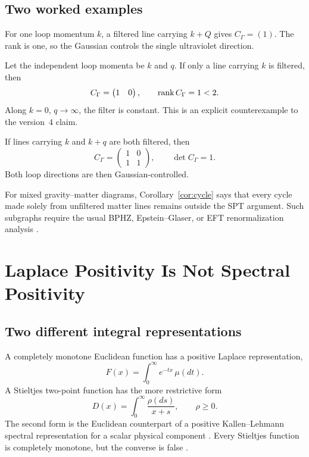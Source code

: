 \documentclass[11pt]{article}
\begin{document}
\subsection{Two worked examples}

\begin{example}
For one loop momentum \(k\), a filtered line carrying \(k+Q\) gives
\(C_\Gamma=(1)\). The rank is one, so the Gaussian controls the single
ultraviolet direction.
\end{example}

\begin{example}
Let the independent loop momenta be \(k\) and \(q\). If only a line carrying
\(k\) is filtered, then
\[
 C_\Gamma=\begin{pmatrix}1&0\end{pmatrix},
 \qquad \operatorname{rank} C_\Gamma=1<2.
\]
Along \(k=0\), \(q\to\infty\), the filter is constant. This is an explicit
counterexample to the version~4 claim.

If lines carrying \(k\) and \(k+q\) are both filtered, then
\[
 C_\Gamma=
 \begin{pmatrix}
 1&0\\
 1&1
 \end{pmatrix},
 \qquad \det C_\Gamma=1.
\]
Both loop directions are then Gaussian-controlled.
\end{example}

For mixed gravity--matter diagrams, Corollary~\ref{cor:cycle} says that every
cycle made solely from unfiltered matter lines remains outside the SPT
argument. Such subgraphs require the usual BPHZ, Epstein--Glaser, or EFT
renormalization analysis \cite{Weinberg1965,EpsteinGlaser1973,
BrunettiFredenhagen2000}.

\section{Laplace Positivity Is Not Spectral Positivity}

\subsection{Two different integral representations}

A completely monotone Euclidean function has a positive Laplace
representation,
\begin{equation}
 F(x)=\int_0^\infty e^{-tx}\,\mu(dt).
 \label{eq:laplace-general}
\end{equation}
A Stieltjes two-point function has the more restrictive form
\begin{equation}
 D(x)=\int_0^\infty\frac{\rho(ds)}{x+s},
 \qquad \rho\geq0.
 \label{eq:stieltjes}
\end{equation}
The second form is the Euclidean counterpart of a positive
Kallen--Lehmann spectral representation for a scalar physical component
\cite{Kallen1952,Lehmann1954}. Every Stieltjes function is completely
monotone, but the converse is false \cite{Widder1941,Schilling2012}.
\end{document}
